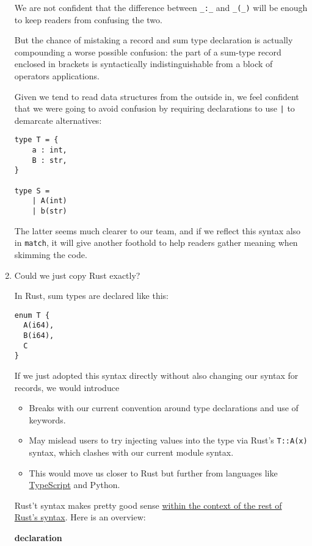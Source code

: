 \documentclass[11pt]{article}
\begin{document}
\begin{enumerate}
We are not confident that the difference between \texttt{\_:\_} and \texttt{\_(\_)} will be enough
to keep readers from confusing the two.

But the chance of mistaking a record and sum type declaration is actually
compounding a worse possible confusion: the part of a sum-type record enclosed
in brackets is syntactically indistinguishable from a block of operators
applications.

Given we tend to read data structures from the outside in, we feel confident
that we were going to avoid confusion by requiring declarations to use \texttt{|} to
demarcate alternatives:

\begin{verbatim}
type T = {
    a : int,
    B : str,
}

type S =
    | A(int)
    | b(str)
\end{verbatim}

The latter seems much clearer to our team, and if we reflect this syntax also in
\texttt{match}, it will give another foothold to help readers gather meaning when
skimming the code.


\item Could we just copy Rust exactly?
\label{sec:org04e0796}

In Rust, sum types are declared like this:

\begin{verbatim}
enum T {
  A(i64),
  B(i64),
  C
}
\end{verbatim}

If we just adopted this syntax directly without also changing our syntax for
records, we would introduce

\begin{itemize}
\item Breaks with our current convention around type declarations and
use of keywords.
\item May mislead users to try injecting values into the type via Rust's
\texttt{T::A(x)} syntax, which clashes with our current module syntax.
\item This would move us closer to Rust but further from languages like \href{https://www.typescriptlang.org/docs/handbook/2/everyday-types.html\#type-aliases}{TypeScript}
and Python.
\end{itemize}

Rust't syntax makes pretty good sense \uline{within the context of the rest of Rust's
syntax}. Here is an overview:

\textbf{declaration}


\end{enumerate}
\end{document}
